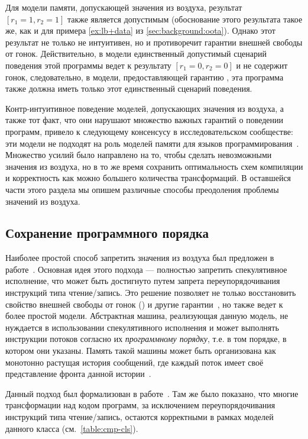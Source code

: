 Для модели памяти, допускающей значения из воздуха, 
результат ${[r_1=1, r_2=1]}$ также является допустимым
(обоснование этого результата такое же, как и для 
примера \ref{ex:lb+data} из \cref{sec:background:oota}).
Однако этот результат не только не интуитивен, 
но и противоречит гарантии внешней свободы от гонок. 
Действительно, в модели \SC единственный допустимый 
сценарий поведения этой программы ведет к результату $[r_1=0, r_2=0]$ 
и не содержит гонок, следовательно, 
в модели, предоставляющей гарантию \eDRF, 
эта программа также должна иметь только этот единственный сценарий поведения. 

Контр-интуитивное поведение моделей, 
допускающих значения из воздуха, 
а также тот факт, что они нарушают множество 
важных гарантий о поведении программ, 
привело к следующему консенсусу в исследовательском сообществе: 
эти модели не подходят на роль моделей памяти 
для языков программирования~\cite{Boehm-Demsky:MSPC14, Batty-al:ESOP15}.  
Множество усилий было направлено на то, 
чтобы сделать невозможными значения из воздуха, 
но в то же время сохранить оптимальность схем 
компиляции и корректность как можно большего количества трансформаций. 
В оставшейся части этого раздела мы опишем различные 
способы преодоления проблемы значений из воздуха. 

\subsection{Сохранение программного порядка}
\label{sec:analysis:porf}

Наиболее простой способ запретить значения из воздуха 
был предложен в работе~\cite{Boehm-Demsky:MSPC14}.
Основная идея этого подхода --- полностью запретить спекулятивное исполнение, 
что может быть достигнуто путем запрета переупорядочивания 
инструкций типа чтение/запись. 
Это решение позволяет не только восстановить 
свойство внешней свободы от гонок (\eDRF) 
и другие гарантии~\cite{Lahav-al:PLDI17}, 
но также ведет к более простой модели. 
Абстрактная машина, реализующая данную модель, 
не нуждается в использовании спекулятивного исполнения
и может выполнять инструкции потоков согласно их
\emph{программному порядку}, т.е. в том порядке, в котором они указаны. 
Память такой машины может быть организована 
как монотонно растущая история сообщений, 
где каждый поток имеет своё представление  
фронта данной истории~\cite{Dolan-al:PLDI18, Doherty-al:PPoPP19}. 

Данный подход был формализован в работе~\cite{Lahav-al:PLDI17}.
Там же было показано, что многие трансформации над кодом программ, 
за исключением переупорядочивания инструкций типа чтение/запись, 
остаются корректными в рамках моделей данного класса (см.~\cref{table:cmp-cls}).

